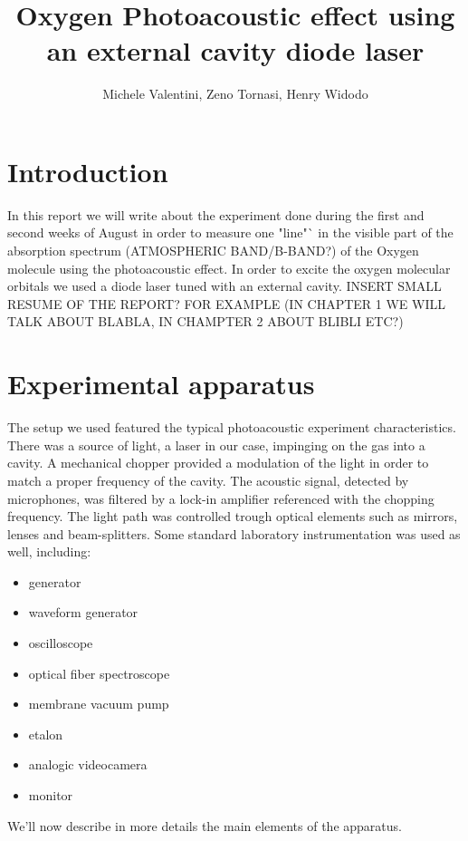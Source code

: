 \documentclass[a4paper,11pt]{article}
\title{Oxygen Photoacoustic effect using an external cavity diode laser}
\author{Michele Valentini, Zeno Tornasi, Henry Widodo}
\begin{document}
\maketitle
\newpage
\tableofcontents
\newpage

\section*{Introduction}

In this report we will write about the experiment done during the first and second weeks of August in order to measure one "line"` in the visible part of the absorption spectrum (ATMOSPHERIC BAND/B-BAND?) of the Oxygen molecule using the photoacoustic effect. In order to excite the oxygen molecular orbitals we used a diode laser tuned with an external cavity. INSERT SMALL RESUME OF THE REPORT? FOR EXAMPLE (IN CHAPTER 1 WE WILL TALK ABOUT BLABLA, IN CHAMPTER 2 ABOUT BLIBLI ETC?)

\newpage
\section{Experimental apparatus}
The setup we used featured the typical photoacoustic experiment characteristics. There was a source of light, a laser in our case, impinging on the gas into a cavity. A mechanical chopper provided a modulation of the light in order to match a proper frequency of the cavity. The acoustic signal, detected by microphones, was filtered by a lock-in amplifier referenced with the chopping frequency. The light path was controlled trough optical elements such as mirrors, lenses and beam-splitters. Some standard laboratory instrumentation was used as well, including:
\begin{itemize}
\item generator \item waveform generator \item oscilloscope \item optical fiber spectroscope \item membrane vacuum pump \item etalon \item analogic videocamera \item monitor
\end{itemize}
 We'll now describe in more details the main elements of the apparatus.
\end{document}
